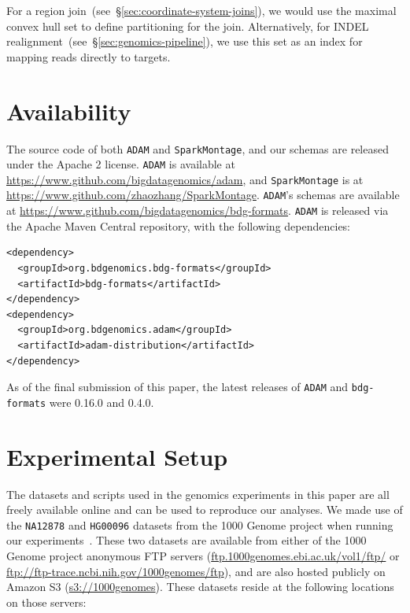\documentclass{sig-alternate}
\begin{document}
For a region join~(see~\S\ref{sec:coordinate-system-joins}), we would use the maximal convex hull
set to define partitioning for the join. Alternatively, for INDEL realignment~(see~\S\ref{sec:genomics-pipeline}),
we use this set as an index for mapping reads directly to targets.

\section{Availability}
\label{sec:availability}

The source code of both \texttt{ADAM} and \texttt{SparkMontage}, and our schemas are released under the Apache 2
license. \texttt{ADAM} is available at \url{https://www.github.com/bigdatagenomics/adam}, and \texttt{SparkMontage}
is at \url{https://www.github.com/zhaozhang/SparkMontage}. \texttt{ADAM}'s schemas are available at
\url{https://www.github.com/bigdatagenomics/bdg-formats}. \linebreak \texttt{ADAM} is released via the Apache Maven
Central repository, with the following dependencies:

\begin{verbatim}
<dependency>
  <groupId>org.bdgenomics.bdg-formats</groupId>
  <artifactId>bdg-formats</artifactId>
</dependency>
<dependency>
  <groupId>org.bdgenomics.adam</groupId>
  <artifactId>adam-distribution</artifactId>
</dependency>
\end{verbatim}

As of the final submission of this paper, the latest releases of \texttt{ADAM} and \texttt{bdg-formats} were 0.16.0 and 0.4.0.

\section{Experimental Setup}
\label{sec:experimental-setup}

The datasets and scripts used in the genomics experiments in this paper are all freely available online
and can be used to reproduce our analyses. We made use of the \texttt{NA12878} and \texttt{HG00096}
datasets from the 1000 Genome project when running our experiments~\cite{siva08}. These two datasets
are available from either of the 1000 Genome project anonymous FTP servers
(\url{ftp.1000genomes.ebi.ac.uk/vol1/ftp/} or \url{ftp://ftp-trace.ncbi.nih.gov/1000genomes/ftp}), and are
also hosted publicly on Amazon S3 (\url{s3://1000genomes}). These datasets reside at the following
locations on those servers:
\end{document}

